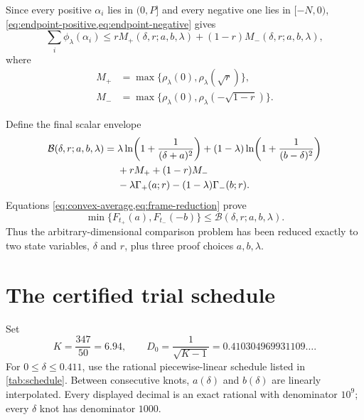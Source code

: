 \documentclass[11pt]{article}
\theoremstyle{definition}
\newcommand{\Kcert}{\frac{347}{50}}
\begin{document}
Since every positive $\alpha_i$ lies in $(0,P]$ and every negative one lies in $[-N,0)$, \cref{eq:endpoint-positive,eq:endpoint-negative} gives
\begin{equation}
  \sum_i\phi_\lambda(\alpha_i)
  \le rM_+(\delta,r;a,b,\lambda)+(1-r)M_-(\delta,r;a,b,\lambda),
  \label{eq:frame-reduction}
\end{equation}
where
\begin{align}
  M_+&=\max\{\rho_\lambda(0),\rho_\lambda(\sqrt r)\},\\
  M_-&=\max\{\rho_\lambda(0),\rho_\lambda(-\sqrt{1-r})\}.
\end{align}

Define the final scalar envelope
\begin{align}
  \mathcal B(\delta,r;a,b,\lambda)
  ={}&\lambda\ln\!\left(1+\frac1{(\delta+a)^2}\right)
  +(1-\lambda)\ln\!\left(1+\frac1{(b-\delta)^2}\right)\notag\\
  &+rM_++(1-r)M_-\notag\\
  &-\lambda\Gamma_+(a;r)-(1-\lambda)\Gamma_-(b;r).
  \label{eq:B}
\end{align}
Equations \cref{eq:convex-average,eq:frame-reduction} prove
\begin{equation}
  \min\{F_{t_+}(a),F_{t_-}(-b)\}
  \le\mathcal B(\delta,r;a,b,\lambda).
  \label{eq:B-bounds-F}
\end{equation}
Thus the arbitrary-dimensional comparison problem has been reduced exactly to two state variables, $\delta$ and $r$, plus three proof choices $a,b,\lambda$.

\section{The certified trial schedule}

Set
\begin{equation}
  K=\Kcert=6.94,
  \qquad
  D_0=\frac1{\sqrt{K-1}}=0.410304969931109\ldots .
  \label{eq:KD0}
\end{equation}
For $0\le\delta\le0.411$, use the rational piecewise-linear schedule listed in \cref{tab:schedule}.  Between consecutive knots, $a(\delta)$ and $b(\delta)$ are linearly interpolated.  Every displayed decimal is an exact rational with denominator $10^9$; every $\delta$ knot has denominator $1000$.
\end{document}
